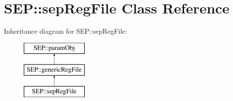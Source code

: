 \hypertarget{class_s_e_p_1_1sep_reg_file}{}\section{S\+EP\+:\+:sep\+Reg\+File Class Reference}
\label{class_s_e_p_1_1sep_reg_file}
Inheritance diagram for S\+EP\+:\+:sep\+Reg\+File\+:\begin{figure}[H]
\begin{center}
\leavevmode
\includegraphics[height=3.000000cm]{class_s_e_p_1_1sep_reg_file}
\end{center}
\end{figure}
